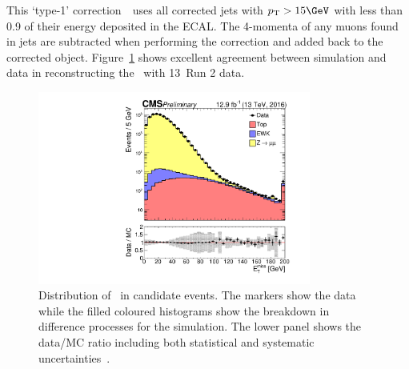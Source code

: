 This `type-1' correction~\cite{met_fig}~uses all corrected jets with $\pt > 15\GeV$ with less than 0.9 of their energy deposited in the ECAL.
The 4-momenta of any muons found in jets are subtracted when performing the correction and added back to the corrected object.
Figure~\ref{fig:met_fig} shows excellent agreement between simulation and data
in reconstructing the \met~with 13\TeV~Run 2 data.

\begin{figure}
\centering
    \includegraphics[width=0.8\textwidth]{./Figures/reconstruction/met_fig.pdf}
  \caption{Distribution of \met~in \zmumu candidate events. The markers show the data while the filled coloured histograms
  show the breakdown in difference processes for the simulation. The lower panel shows the data/MC ratio including
  both statistical and systematic uncertainties~\cite{met_fig}. \label{fig:met_fig} 
}
\end{figure}
